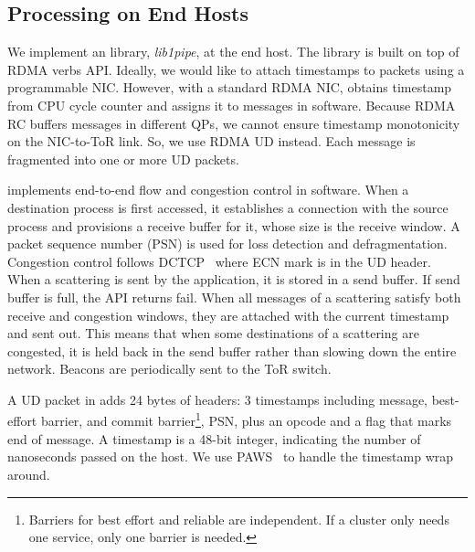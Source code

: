 \subsection{Processing on End Hosts}



We implement an \sys{} library, \textit{lib1pipe}, at the end host. The library is built on top of RDMA verbs API.
Ideally, we would like to attach timestamps to packets using a programmable NIC.
However, with a standard RDMA NIC, \sys{} obtains timestamp from CPU cycle counter and assigns it to messages in software.
Because RDMA RC buffers messages in different QPs, we cannot ensure timestamp monotonicity on the NIC-to-ToR link.
So, we use RDMA UD instead.
Each \sys{} message is fragmented into one or more UD packets.%

\sys{} implements end-to-end flow and congestion control in software. When a destination process is first accessed, it establishes a connection with the source process and provisions a receive buffer for it, whose size is the receive window. A packet sequence number (PSN) is used for loss detection and defragmentation. Congestion control follows DCTCP~\cite{alizadeh2010data} where ECN mark is in the UD header. When a scattering is sent by the application, it is stored in a send buffer. If send buffer is full, the API returns fail. When all messages of a scattering satisfy both receive and congestion windows, they are attached with the current timestamp and sent out.
This means that when some destinations of a scattering are congested, it is held back in the send buffer rather than slowing down the entire network.
Beacons are periodically sent to the ToR switch.

A UD packet in \sys{} adds 24 bytes of headers: 3 timestamps including message, best-effort barrier, and commit barrier\footnote{Barriers for best effort and reliable \sys{} are independent. If a cluster only needs one service, only one barrier is needed.}, PSN, plus an opcode and a flag that marks end of message.
A timestamp is a 48-bit integer, indicating the number of nanoseconds passed on the host. %
We use PAWS~\cite{jacobson1992tcp} to handle the timestamp wrap around.


